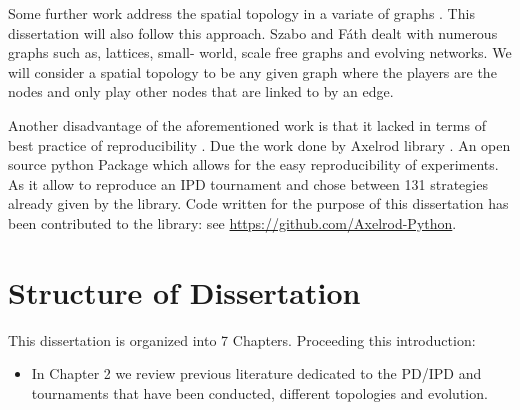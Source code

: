 Some further work address the spatial topology in a variate of graphs
\cite{Dresher1992a, Szabo2007}. %
This dissertation will also follow this approach. Szabo and Fáth dealt with
numerous graphs such as, lattices, small- world, scale free graphs and evolving
networks. We will consider a spatial topology to be any given graph  where the
players are the nodes and only play other nodes that are linked to by
an edge.

Another disadvantage of the aforementioned work is that it lacked in terms of
best practice of reproducibility \cite{Axelrod1980a,Axelrod1980b,Stephens2002,Chong2004,Stewart2013}
. Due the work done by Axelrod library \cite{axelrodproject}.
An open source python Package which allows for the easy
reproducibility of experiments.  As it allow to reproduce an IPD tournament and
chose between 131 strategies already given by the library.  Code written for the
purpose of this dissertation has been contributed to the library: see
\url{https://github.com/Axelrod-Python}.


\section{Structure of Dissertation}
This dissertation is organized into 7 Chapters. Proceeding this introduction:
\begin{itemize}
  \item In Chapter 2 we review previous literature dedicated to the PD/IPD
        and tournaments that have been conducted, different topologies and evolution.
\end{itemize}
